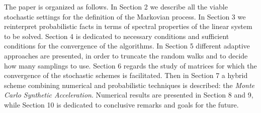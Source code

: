 The paper is organized as follows. In Section 2 we describe all the
viable stochastic settings for the definition of the Markovian process. In
Section 3 we reinterpret probabilistic facts in terms of spectral properties of
the linear system to be solved. Section 4 is dedicated to necessary conditions
and sufficient conditions for the convergence of the algorithms. In Section 5
different adaptive approaches are presented, in order to truncate the random
walks and to decide how many samplings to use. Section 6 regards the study
of matrices for which the convergence of the stochastic schemes is facilitated.
Then in Section 7 a hybrid scheme combining numerical and probabilistic
techniques is described: the \textit{Monte Carlo Synthetic Acceleration}.
Numerical results are presented in Section 8 and 9, while Section 10 is
dedicated to
conclusive remarks and goals for the future.

